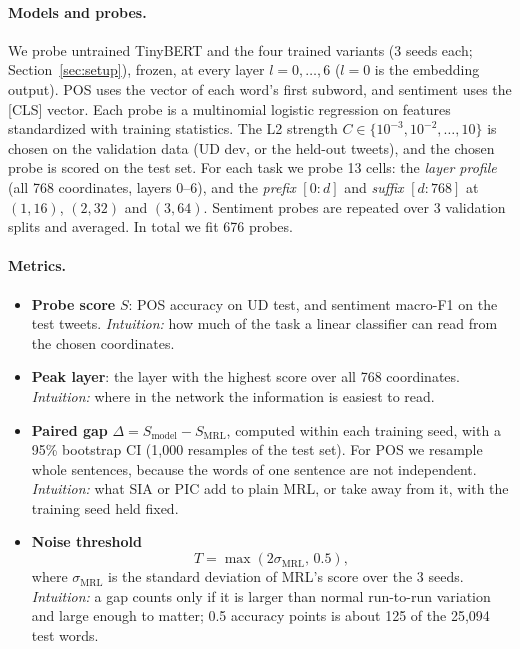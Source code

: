 \paragraph{Models and probes.}
We probe untrained TinyBERT and the four trained variants (3 seeds each; Section~\ref{sec:setup}), frozen, at every layer $l=0,\dots,6$ ($l{=}0$ is the embedding output).
POS uses the vector of each word's first subword, and sentiment uses the [CLS] vector.
Each probe is a multinomial logistic regression on features standardized with training statistics.
The L2 strength $C\in\{10^{-3},10^{-2},\dots,10\}$ is chosen on the validation data (UD dev, or the held-out tweets), and the chosen probe is scored on the test set.
For each task we probe 13 cells: the \emph{layer profile} (all 768 coordinates, layers 0--6), and the \emph{prefix} $[0{:}d]$ and \emph{suffix} $[d{:}768]$ at $(1,16)$, $(2,32)$ and $(3,64)$.
Sentiment probes are repeated over 3 validation splits and averaged.
In total we fit 676 probes.

\paragraph{Metrics.}
\begin{itemize}
  \item \textbf{Probe score} $S$: POS accuracy on UD test, and sentiment macro-F1 on the test tweets.
  \emph{Intuition:} how much of the task a linear classifier can read from the chosen coordinates.

  \item \textbf{Peak layer}: the layer with the highest score over all 768 coordinates.
  \emph{Intuition:} where in the network the information is easiest to read.

  \item \textbf{Paired gap} $\Delta=S_{\text{model}}-S_{\text{MRL}}$, computed within each training seed, with a 95\% bootstrap CI (1,000 resamples of the test set).
  For POS we resample whole sentences, because the words of one sentence are not independent.
  \emph{Intuition:} what SIA or PIC add to plain MRL, or take away from it, with the training seed held fixed.

  \item \textbf{Noise threshold}
  \[
    T=\max\left(2\sigma_{\text{MRL}},\,0.5\right),
  \]
  where $\sigma_{\text{MRL}}$ is the standard deviation of MRL's score over the 3 seeds.
  \emph{Intuition:} a gap counts only if it is larger than normal run-to-run variation and large enough to matter; 0.5 accuracy points is about 125 of the 25,094 test words.
\end{itemize}

